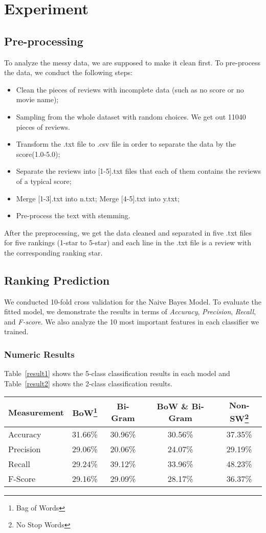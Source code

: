\documentclass[12pt]{article}
\begin{document}
\section{Experiment}

\subsection{Pre-processing}
To analyze the messy data, we are supposed to make it clean first. To pre-process the data, we conduct the following steps:
\begin{itemize}
\item Clean the pieces of reviews with incomplete data (such as no score or no movie name);
\item Sampling from the whole dataset with random choices. We get out 11040 pieces of reviews.
\item Transform the .txt file to .csv file in order to separate the data by the score(1.0-5.0);
\item Separate the reviews into [1-5].txt files that each of them contains the reviews of a typical score;
\item Merge [1-3].txt into n.txt; Merge [4-5].txt into y.txt;
\item Pre-process the text with stemming.
\end{itemize}

After the preprocessing, we get the data cleaned and separated in five .txt files for five rankings (1-star to 5-star) and each line in the .txt file is a review with the corresponding ranking star.


\subsection{Ranking Prediction}
We conducted 10-fold cross validation for the Naive Bayes Model. To evaluate the fitted model, we demonstrate the results in terms of \emph{Accuracy}, \emph{Precision}, \emph{Recall}, and \emph{F-score}. We also analyze the 10 most important features in each classifier we trained.

\subsubsection{Numeric Results}
Table~\ref{result1} shows the 5-class classification results in each model and Table~\ref{result2} shows the 2-class classification results.

\begin{table*}[!htbp]
\centering
\caption{Results for 5-class Prediction}\label{result1}
\begin{tabular}{lcccc}
\hline
\hline
Measurement& BoW\footnote{Bag of Words} & Bi-Gram & BoW \& Bi-Gram & Non-SW\footnote{No Stop Words}\\
 \hline
Accuracy&31.66\%&30.96\%&30.56\%&37.35\%\\
Precision&29.06\%&20.06\%&24.07\%&29.19\%\\
Recall&29.24\%&39.12\%&33.96\%&48.23\%\\
F-Score&29.16\%&29.09\%&28.17\%&36.37\%\\
\hline
\hline
\end{tabular}
\end{table*}
\end{document}
